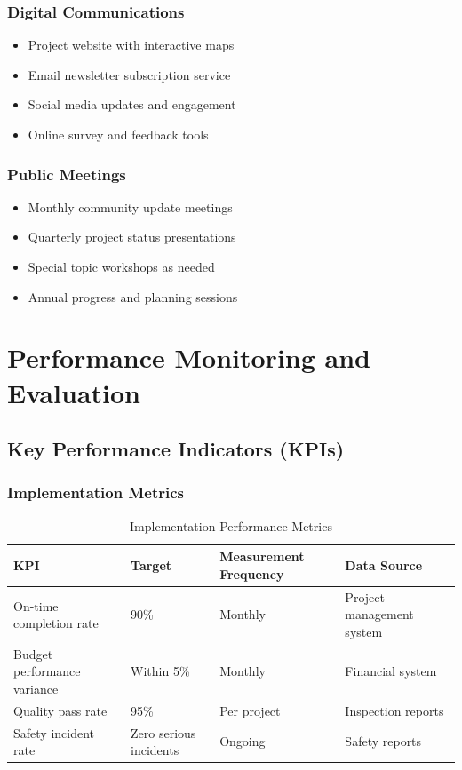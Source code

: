 \documentclass[11pt,letterpaper]{article}
\begin{document}
\subsubsection{Digital Communications}
\begin{itemize}
    \item Project website with interactive maps
    \item Email newsletter subscription service
    \item Social media updates and engagement
    \item Online survey and feedback tools
\end{itemize}

\subsubsection{Public Meetings}
\begin{itemize}
    \item Monthly community update meetings
    \item Quarterly project status presentations
    \item Special topic workshops as needed
    \item Annual progress and planning sessions
\end{itemize}

\section{Performance Monitoring and Evaluation}

\subsection{Key Performance Indicators (KPIs)}

\subsubsection{Implementation Metrics}
\begin{table}[h]
\centering
\caption{Implementation Performance Metrics}
\begin{tabular}{llll}
\toprule
\textbf{KPI} & \textbf{Target} & \textbf{Measurement Frequency} & \textbf{Data Source} \\
\midrule
On-time completion rate & 90\% & Monthly & Project management system \\
Budget performance variance & Within 5\% & Monthly & Financial system \\
Quality pass rate & 95\% & Per project & Inspection reports \\
Safety incident rate & Zero serious incidents & Ongoing & Safety reports \\
\bottomrule
\end{tabular}
\end{table}
\end{document}
